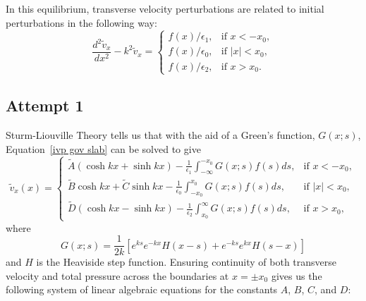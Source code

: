 \documentclass{aastex61}
\begin{document}
In this equilibrium, transverse velocity perturbations are related to initial perturbations in the following way:
\begin{equation}
\frac{d^2\tilde{v}_x}{dx^2} - k^2\tilde{v}_x = 
\begin{cases}
f(x)/\epsilon_1, & \text{if  } x<-x_0,\\
f(x)/\epsilon_0, & \text{if  } |x|<x_0,\\
f(x)/\epsilon_2, & \text{if  } x>x_0.
\end{cases}
\label{ivp gov slab}
\end{equation}


\subsection{Attempt 1}
Sturm-Liouville Theory tells us that with the aid of a Green's function, $G(x;s)$, Equation~\eqref{ivp gov slab} can be solved to give
\begin{equation}
\tilde{v}_x(x) =
\begin{cases}
\tilde{A}(\cosh{kx} + \sinh{kx}) - \frac{1}{\epsilon_1} \int_{-\infty}^{-x_0} G(x;s)f(s)ds, & \text{if  } x<-x_0,\\
\tilde{B}\cosh{kx} + \tilde{C}\sinh{kx} - \frac{1}{\epsilon_0} \int_{-x_0}^{x_0} G(x;s)f(s)ds, & \text{if  } |x|<x_0,\\
\tilde{D}(\cosh{kx} - \sinh{kx}) - \frac{1}{\epsilon_2} \int_{x_0}^{\infty} G(x;s)f(s)ds, & \text{if  } x>x_0,
\end{cases}
\label{ivp slab sol}
\end{equation}
where
\begin{equation}
G(x;s) = \frac{1}{2k}[e^{ks}e^{-kx}H(x-s) + e^{-ks}e^{kx}H(s-x)]
\end{equation}
and $H$ is the Heaviside step function. Ensuring continuity of both transverse velocity and total pressure across the boundaries at $x=\pm x_0$ gives us the following system of linear algebraic equations for the constants $A$, $B$, $C$, and $D$:
\end{document}
